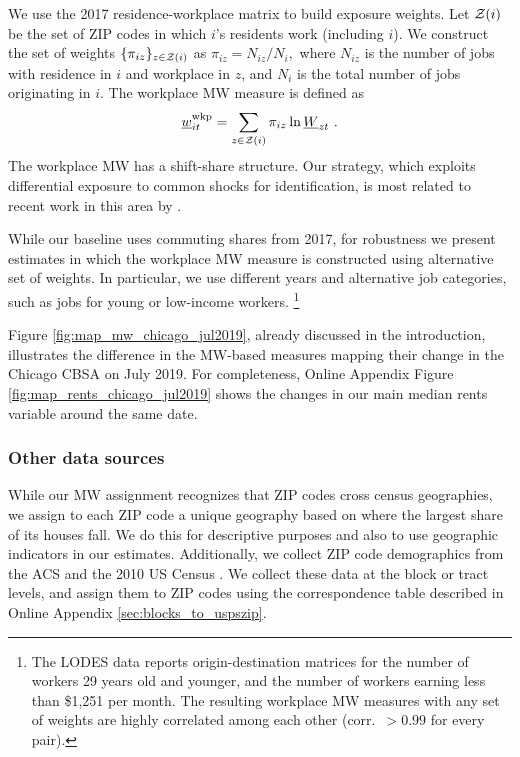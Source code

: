 We use the 2017 residence-workplace matrix to build exposure weights.
Let $\mathcal{Z}(i)$ be the set of ZIP codes in which $i$'s residents work 
(including $i$).
We construct the set of weights $\{\pi_{iz}\}_{z\in\mathcal{Z}(i)}$ as 
$ \pi_{iz} = N_{iz}/{N_i} , $
where 
$N_{iz}$ is the number of jobs with residence in $i$ and workplace in $z$, 
and $N_i$ is the total number of jobs originating in $i$.
The workplace MW measure is defined as
\begin{equation*}\label{eq:mw_wkp_def}
    \mw^{\wkp}_{it} = \sum_{z\in\Z(i)} \pi_{iz} \ln \MW_{zt} \ .
\end{equation*}
The workplace MW has a shift-share structure.
Our strategy, which exploits differential exposure to common shocks for 
identification, is most related to recent work in this area by 
\textcite{GoldsmithpinkhamEtAl2020}.

While our baseline uses commuting shares from 2017,
for robustness we present estimates in which the workplace MW measure
is constructed using alternative set of weights.
In particular, we use different years and alternative job categories,
such as jobs for young or low-income workers.%
\footnote{The LODES data reports origin-destination matrices for the number of 
    workers 29 years old and younger, and the number of workers earning less 
    than \$1,251 per month.
The resulting workplace MW measures with any set of weights are highly correlated 
among each other (corr.\ $>0.99$ for every pair).}

Figure \ref{fig:map_mw_chicago_jul2019}, already discussed in the introduction,
illustrates the difference in the MW-based measures mapping their change in the 
Chicago CBSA on July 2019.
For completeness, Online Appendix Figure \ref{fig:map_rents_chicago_jul2019} 
shows the changes in our main median rents variable around the same date.


\subsubsection{Other data sources}\label{sec:data_other}

While our MW assignment recognizes that ZIP codes cross census geographies, 
we assign to each ZIP code a unique geography based on where the largest 
share of its houses fall.
We do this for descriptive purposes and also to use geographic indicators  
in our estimates.
Additionally, we collect ZIP code demographics from the ACS 
\parencite{CensusACS} and the 2010 US Census \parencite{CensusDecennial}.
We collect these data at the block or tract levels, and assign them to ZIP codes
using the correspondence table described in Online Appendix 
\ref{sec:blocks_to_uspszip}.

